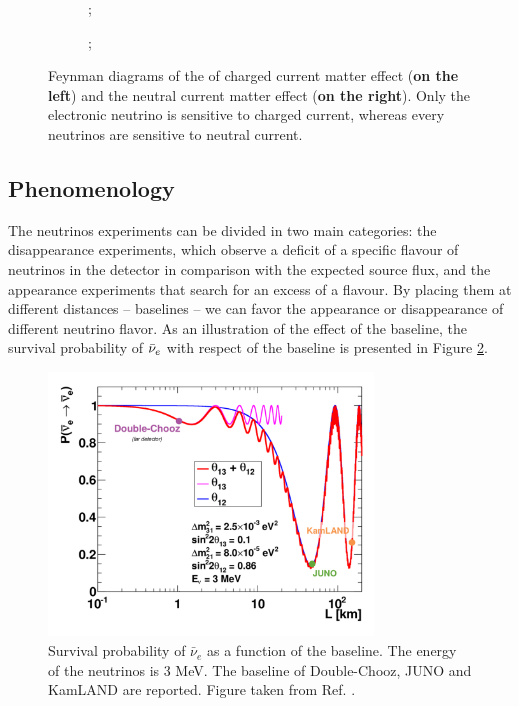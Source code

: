 \begin{figure}[ht]
  \centering
  \begin{subfigure}[t]{0.48\linewidth}
    \centering
    ;
  \end{subfigure}
  \begin{subfigure}[t]{0.48\linewidth}
    \centering
    ;
  \end{subfigure}
  \caption{Feynman diagrams of the of charged current matter effect (\textbf{on the left}) and the neutral current matter effect (\textbf{on the right}). Only the electronic neutrino is sensitive to charged current, whereas every neutrinos are sensitive to neutral current.}
  \label{fig:neutrinos:msw}
\end{figure}

\subsection{Phenomenology}

The neutrinos experiments can be divided in two main categories: the disappearance experiments, which observe a deficit of a specific flavour of neutrinos in the detector in comparison with the expected source flux, and the appearance experiments that search for an excess of a flavour. By placing them at different distances -- baselines -- we can favor the appearance or disappearance of different neutrino flavor. As an illustration of the effect of the baseline, the survival probability of $\bar{\nu}_{e}$ with respect of the baseline is presented in Figure \ref{fig:neutrino:baseline_effect}.

\begin{figure}[ht]
  \centering
  \includegraphics[height=7cm]{images/neutrinos/baseline_effect.png}
  \caption{Survival probability of $\bar{\nu}_e$ as a function of the baseline. The energy of the neutrinos is 3 MeV. The baseline of Double-Chooz, JUNO and KamLAND are reported. Figure taken from Ref. \cite{lebrin_towards_2022}.}
  \label{fig:neutrino:baseline_effect}
\end{figure}

